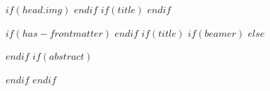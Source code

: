 \pagestyle{fancy}
\fancyhead{} %
$if(head.img)$
$endif$
$if(title)$
$endif$

\allsectionsfont{\color{red}}

$if(has-frontmatter)$
\frontmatter
$endif$
$if(title)$
$if(beamer)$
\frame{\titlepage}
$else$
{\color{red}\maketitle}
$endif$
$if(abstract)$
\begin{abstract}
$abstract$
\end{abstract}
$endif$
$endif$
